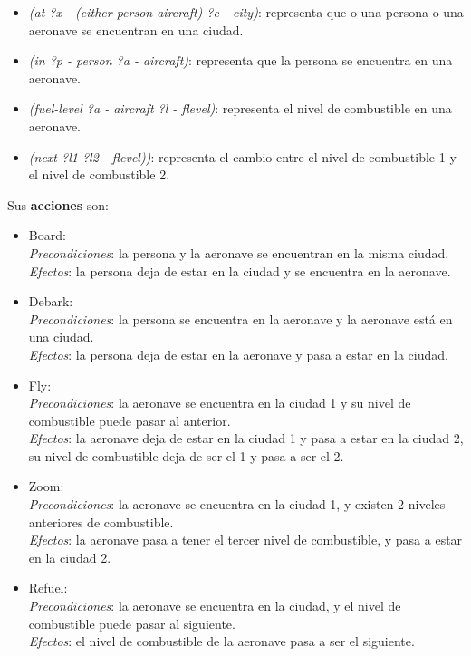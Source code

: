 \documentclass{uc3mpracticas}
\begin{document}
  \begin{itemize}
    \item \textit{(at ?x - (either person aircraft) ?c - city)}: representa que o una persona o una aeronave se encuentran en una ciudad.
  	\item \textit{(in ?p - person ?a - aircraft)}: representa que la persona se encuentra en una aeronave.
  	\item \textit{(fuel-level ?a - aircraft ?l - flevel)}: representa el nivel de combustible en una aeronave.
  	\item \textit{(next ?l1 ?l2 - flevel))}: representa el cambio entre el nivel de combustible 1 y el nivel de combustible 2.
  \end{itemize}

  Sus \textbf{acciones} son:
  \begin{itemize}
    \item Board:
    \\\textit{Precondiciones}: la persona y la aeronave se encuentran en la misma ciudad.
    \\\textit{Efectos}: la persona deja de estar en la ciudad y se encuentra en la aeronave.
    \item Debark:
    \\\textit{Precondiciones}: la persona se encuentra en la aeronave y la aeronave está en una ciudad.
    \\\textit{Efectos}: la persona deja de estar en la aeronave y pasa a estar en la ciudad.
    \item Fly:
    \\\textit{Precondiciones}: la aeronave se encuentra en la ciudad 1 y su nivel de combustible puede pasar al anterior.
    \\\textit{Efectos}: la aeronave deja de estar en la ciudad 1 y pasa a estar en la ciudad 2, su nivel de combustible deja de ser el 1 y pasa a ser el 2.
    \item Zoom:
    \\\textit{Precondiciones}: la aeronave se encuentra en la ciudad 1, y existen 2 niveles anteriores de combustible.
    \\\textit{Efectos}: la aeronave pasa a tener el tercer nivel de combustible, y pasa a estar en la ciudad 2.
    \item Refuel:
    \\\textit{Precondiciones}: la aeronave se encuentra en la ciudad, y el nivel de combustible puede pasar al siguiente.
    \\\textit{Efectos}: el nivel de combustible de la aeronave pasa a ser el siguiente.
  \end{itemize}
\end{document}

